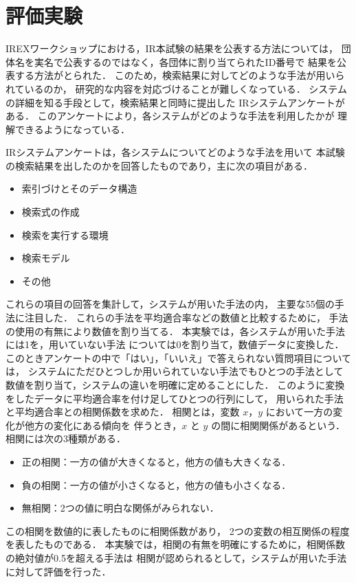 \clearpage
\section{評価実験}
IREXワークショップにおける，IR本試験の結果を公表する方法については，
団体名を実名で公表するのではなく，各団体に割り当てられたID番号で
結果を公表する方法がとられた．
このため，検索結果に対してどのような手法が用いられているのか，
研究的な内容を対応づけることが難しくなっている．
システムの詳細を知る手段として，検索結果と同時に提出した
IRシステムアンケートがある．
このアンケートにより，各システムがどのような手法を利用したかが
理解できるようになっている．

IRシステムアンケートは，各システムについてどのような手法を用いて
本試験の検索結果を出したのかを回答したものであり，主に次の項目がある．
\begin{itemize}
\item 索引づけとそのデータ構造
\item 検索式の作成
\item 検索を実行する環境
\item 検索モデル
\item その他
\end{itemize}
これらの項目の回答を集計して，システムが用いた手法の内，
主要な55個の手法に注目した．
これらの手法を平均適合率などの数値と比較するために，
手法の使用の有無により数値を割り当てる．
本実験では，各システムが用いた手法には1を，用いていない手法
については0を割り当て，数値データに変換した．
このときアンケートの中で「はい」，「いいえ」で答えられない質問項目については，
システムにただひとつしか用いられていない手法でもひとつの手法として
数値を割り当て，システムの違いを明確に定めることにした．
このように変換をしたデータに平均適合率を付け足してひとつの行列にして，
用いられた手法と平均適合率との相関係数を求めた．
相関とは，変数 $x$，$y$ において一方の変化が他方の変化にある傾向を
伴うとき，$x$ と $y$ の間に相関関係があるという．相関には次の3種類がある．
\begin{itemize}
\item[] 正の相関：一方の値が大きくなると，他方の値も大きくなる．
\item[] 負の相関：一方の値が小さくなると，他方の値も小さくなる．
\item[] 無相関：2つの値に明白な関係がみられない．
\end{itemize}
この相関を数値的に表したものに相関係数があり，
2つの変数の相互関係の程度を表したものである．
本実験では，相関の有無を明確にするために，相関係数の絶対値が0.5を超える手法は
相関が認められるとして，システムが用いた手法に対して評価を行った．

